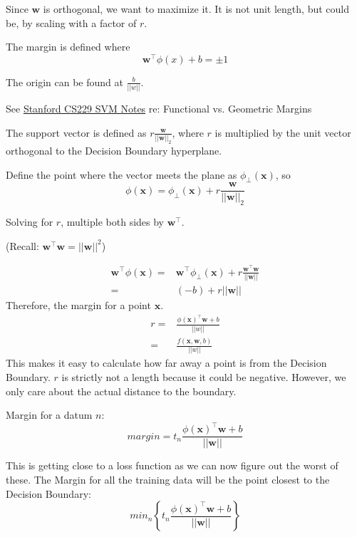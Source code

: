 \documentclass[11pt, oneside]{article}   	%
\begin{document}
Since $\mathbf{w}$ is orthogonal, we want to maximize it. It is not unit length, but could be, by scaling with a factor of $r$.

The margin is defined where
\begin{equation}
\mathbf{w}^\intercal\phi(x)+b = \pm 1
\end{equation}

The origin can be found at $\frac{b}{||w||}$.

See \href{http://cs229.stanford.edu/notes/cs229-notes3.pdf}{Stanford CS229 SVM Notes} re: Functional vs. Geometric Margins

The support vector is defined as $r\frac{\mathbf{w}}{||\mathbf{w}||_2}$, where $r$ is multiplied by the unit vector orthogonal to the Decision Boundary hyperplane. 

Define the point where the vector meets the plane as $\phi_\perp (\mathbf{x})$, so
\begin{equation}
\phi(\mathbf{x}) = \phi_\perp(\mathbf{x}) + r\frac{\mathbf{w}}{||\mathbf{w}||_2}
\end{equation}

Solving for $r$, multiple both sides by $\mathbf{w}^\intercal$.

(Recall: $\mathbf{w}^\intercal\mathbf{w} = ||\mathbf{w}||^2$)

\begin{align}
\mathbf{w}^\intercal\phi(\mathbf{x}) = &\mathbf{w}^\intercal  \phi_\perp(\mathbf{x})  +	 r\frac{\mathbf{w}^\intercal\mathbf{w}}{||\mathbf{w}||} \\
			 = & (-b) + r||\mathbf{w}||
\end{align}
Therefore, the margin for a point $\mathbf{x}$.
\begin{align}
r = &\frac{\phi(\mathbf{x})^\intercal\mathbf{w}+b}{||w||} \\
  = & \frac{f(\mathbf{x},\mathbf{w},b)}{||w||}
\end{align}
This makes it easy to calculate how far away a point is from the Decision Boundary. $r$ is strictly not a length because it could be negative. However, we only care about the actual distance to the boundary.

Margin for a datum $n$:
\begin{equation}
margin = t_n\frac{\phi(\mathbf{x})^\intercal\mathbf{w}+b}{||\mathbf{w}||}
\end{equation}

This is getting close to a loss function as we can now figure out the worst of these. The Margin for all the training data will be the point closest to the Decision Boundary:
\begin{equation}
min_n\left\{ t_n\frac{\phi(\mathbf{x})^\intercal\mathbf{w}+b}{||\mathbf{w}||} \right\}
\end{equation}
\end{document}
